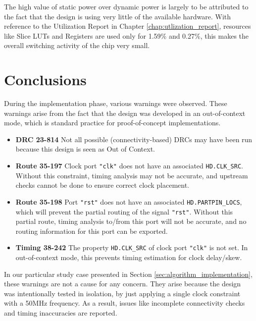The high value of static power over dynamic power is largely to be attributed to the fact that the design is using very little of the available hardware. With reference to the Utilization Report in Chapter \ref{chap:utlization_report}, resources like Slice LUTs and Registers are used only for 1.59\% and 0.27\%, this makes the overall switching activity of the chip very small.

\section{Conclusions}
During the implementation phase, various warnings were observed. These warnings arise from the fact that the design was developed in an out-of-context mode, which is standard practice for proof-of-concept implementations.

\begin{tcolorbox}[colback=yellow!20, colframe=yellow!50!black, title=Warnings]
\begin{itemize}
    \item \textbf{DRC 23-814} Not all possible (connectivity-based) DRCs may have been run because this design is seen as Out of Context.
    \item \textbf{Route 35-197} Clock port \texttt{"clk"} does not have an associated \texttt{HD.CLK\_SRC}. Without this constraint, timing analysis may not be accurate, and upstream checks cannot be done to ensure correct clock placement.
    \item \textbf{Route 35-198} Port \texttt{"rst"} does not have an associated \texttt{HD.PARTPIN\_LOCS}, which will prevent the partial routing of the signal \texttt{"rst"}. Without this partial route, timing analysis to/from this port will not be accurate, and no routing information for this port can be exported.
    \item \textbf{Timing 38-242} The property \texttt{HD.CLK\_SRC} of clock port \texttt{"clk"} is not set. In out-of-context mode, this prevents timing estimation for clock delay/skew.
\end{itemize}
\end{tcolorbox}

In our particular study case presented in Section \ref{sec:algorithm_implementation}, these warnings are not a cause for any concern. They arise because the design was intentionally tested in isolation, by just applying a single clock constraint with a 50MHz frequency. As a result, issues like incomplete connectivity checks and timing inaccuracies are reported.

